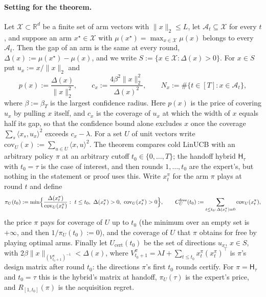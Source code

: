 \documentclass{article}
\theoremstyle{definition}
\theoremstyle{remark}
\newcommand{\R}{\mathbb{R}}
\theoremstyle{remark}
\newcommand{\Hyb}{\mathsf{H}}
\begin{document}
\paragraph{Setting for the theorem.}
Let $\mathcal X\subset\R^d$ be a finite set of arm vectors with
$\|x\|_2\le L$, let $\mathcal A_t\subseteq\mathcal X$ for every $t$, and
suppose an arm $x^\star\in\mathcal X$ with
$\mu(x^\star)=\max_{x\in\mathcal X}\mu(x)$ belongs to every $\mathcal A_t$.
Then the gap of an arm is the same at every round,
$\Delta(x):=\mu(x^\star)-\mu(x)$, and we write
$S:=\{x\in\mathcal X:\Delta(x)>0\}$. For $x\in S$ put $u_x:=x/\|x\|_2$ and
\[
p(x):=\frac{\Delta(x)}{\|x\|_2^2},\qquad
c_x:=\frac{4\beta^2\|x\|_2^2}{\Delta(x)^2},\qquad
N_x:=\#\{t\in[T]:x\in\mathcal A_t\},
\]
where $\beta:=\beta_T$ is the largest confidence radius. Here $p(x)$ is the
price of covering $u_x$ by pulling $x$ itself, and $c_x$ is the coverage of
$u_x$ at which the width of $x$ equals half its gap, so that the confidence
bound alone excludes $x$ once the coverage $\sum_s\langle x_s,u_x\rangle^2$
exceeds $c_x-\lambda$. For a set $U$ of unit vectors write
$\mathrm{cov}_U(x):=\sum_{u\in U}\langle x,u\rangle^2$. The theorem compares
cold LinUCB with an arbitrary policy $\pi$ at an arbitrary cutoff
$t_0\in\{0,\dots,T\}$; the handoff hybrid $\Hyb_\tau$ with $t_0=\tau$ is the
case of interest, and then rounds $1,\dots,t_0$ are the expert's, but nothing
in the statement or proof uses this. Write $x^\pi_t$ for the arm $\pi$ plays
at round $t$ and define
\[
\pi_U(t_0):=\min\Bigl\{\frac{\Delta(x^\pi_t)}{\mathrm{cov}_U(x^\pi_t)}:
\ t\le t_0,\ \Delta(x^\pi_t)>0,\ \mathrm{cov}_U(x^\pi_t)>0\Bigr\},
\qquad
C^{\mathrm{free}}_U(t_0):=\sum_{t\le t_0:\,\Delta(x^\pi_t)=0}\mathrm{cov}_U(x^\pi_t),
\]
the price $\pi$ pays for coverage of $U$ up to $t_0$ (the minimum over an
empty set is $+\infty$, and then $1/\pi_U(t_0):=0$), and the coverage of $U$
that $\pi$ obtains for free by playing optimal arms. Finally let
$U_{\mathrm{cert}}(t_0)$ be the set of directions $u_x$, $x\in S$, with
$2\beta\|x\|_{(V^\pi_{t_0+1})^{-1}}<\Delta(x)$, where
$V^\pi_{t_0+1}=\lambda I+\sum_{t\le t_0}x^\pi_t (x^\pi_t)^\top$ is $\pi$'s design
matrix after round $t_0$: the directions $\pi$'s first $t_0$ rounds certify.
For $\pi=\Hyb_\tau$ and $t_0=\tau$ this is the hybrid's matrix at handoff,
$\pi_U(\tau)$ is the expert's price, and $R_{[1,t_0]}(\pi)$ is the acquisition
regret.
\end{document}
